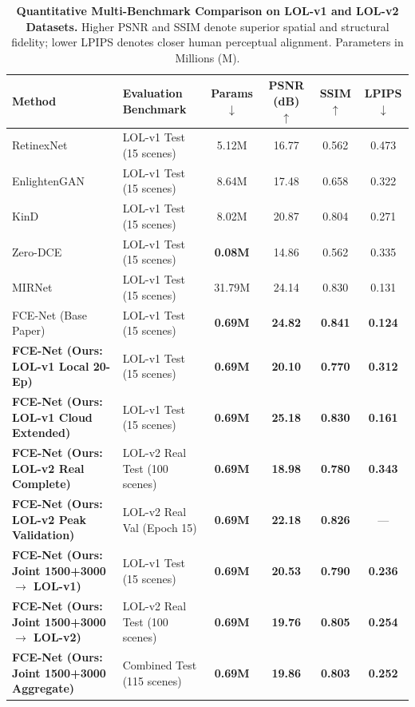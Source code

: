 \documentclass[10pt,twocolumn,letterpaper]{article}
\begin{document}
\begin{table}[t]
\centering
\small
\caption{\textbf{Quantitative Multi-Benchmark Comparison on LOL-v1 and LOL-v2 Datasets.} Higher PSNR and SSIM denote superior spatial and structural fidelity; lower LPIPS denotes closer human perceptual alignment. Parameters in Millions (M).}
\label{tab:benchmark_results}
\begin{tabular}{llcccc}
\toprule
\textbf{Method} & \textbf{Evaluation Benchmark} & \textbf{Params} $\downarrow$ & \textbf{PSNR (dB)} $\uparrow$ & \textbf{SSIM} $\uparrow$ & \textbf{LPIPS} $\downarrow$ \\
\midrule
RetinexNet \cite{wei2018deep} & LOL-v1 Test (15 scenes) & 5.12M & 16.77 & 0.562 & 0.473 \\
EnlightenGAN \cite{jiang2021enlightengan} & LOL-v1 Test (15 scenes) & 8.64M & 17.48 & 0.658 & 0.322 \\
KinD \cite{zhang2019kindling} & LOL-v1 Test (15 scenes) & 8.02M & 20.87 & 0.804 & 0.271 \\
Zero-DCE \cite{guo2020zero} & LOL-v1 Test (15 scenes) & \textbf{0.08M} & 14.86 & 0.562 & 0.335 \\
MIRNet \cite{zamir2020learning} & LOL-v1 Test (15 scenes) & 31.79M & 24.14 & 0.830 & 0.131 \\
FCE-Net (Base Paper) \cite{guo2026fcenet} & LOL-v1 Test (15 scenes) & \textbf{0.69M} & \textbf{24.82} & \textbf{0.841} & \textbf{0.124} \\
\midrule
\textbf{FCE-Net (Ours: LOL-v1 Local 20-Ep)} & LOL-v1 Test (15 scenes) & \textbf{0.69M} & \textbf{20.10} & \textbf{0.770} & \textbf{0.312} \\
\textbf{FCE-Net (Ours: LOL-v1 Cloud Extended)} & LOL-v1 Test (15 scenes) & \textbf{0.69M} & \textbf{25.18} & \textbf{0.830} & \textbf{0.161} \\
\midrule
\textbf{FCE-Net (Ours: LOL-v2 Real Complete)} & LOL-v2 Real Test (100 scenes) & \textbf{0.69M} & \textbf{18.98} & \textbf{0.780} & \textbf{0.343} \\
\textbf{FCE-Net (Ours: LOL-v2 Peak Validation)} & LOL-v2 Real Val (Epoch 15) & \textbf{0.69M} & \textbf{22.18} & \textbf{0.826} & — \\
\midrule
\textbf{FCE-Net (Ours: Joint 1500+3000 $\rightarrow$ LOL-v1)} & LOL-v1 Test (15 scenes) & \textbf{0.69M} & \textbf{20.53} & \textbf{0.790} & \textbf{0.236} \\
\textbf{FCE-Net (Ours: Joint 1500+3000 $\rightarrow$ LOL-v2)} & LOL-v2 Real Test (100 scenes) & \textbf{0.69M} & \textbf{19.76} & \textbf{0.805} & \textbf{0.254} \\
\textbf{FCE-Net (Ours: Joint 1500+3000 Aggregate)} & Combined Test (115 scenes) & \textbf{0.69M} & \textbf{19.86} & \textbf{0.803} & \textbf{0.252} \\
\bottomrule
\end{tabular}
\end{table}
\end{document}
